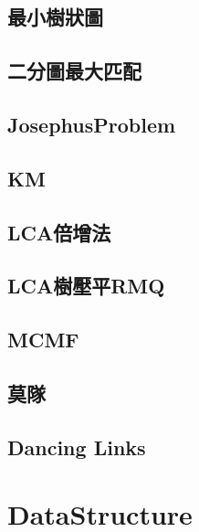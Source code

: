     \subsection{最小樹狀圖}
        
    \subsection{二分圖最大匹配}
        
    \subsection{JosephusProblem}
        
    \subsection{KM}
        
    \subsection{LCA倍增法}
        
    \subsection{LCA樹壓平RMQ}
        
    \subsection{MCMF}
        
    \subsection{莫隊}
        
    \subsection{Dancing Links}
        

\section{DataStructure}
